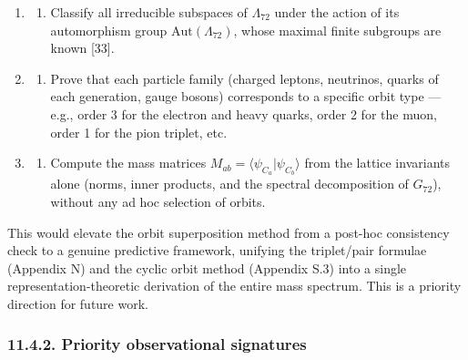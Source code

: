\documentclass[11pt]{article}
\providecommand{\tightlist}{\setlength{\itemsep}{2pt}\setlength{\parskip}{6pt}}
\providecommand{\tightlist}{%
  \setlength{\itemsep}{2pt}\setlength{\parskip}{6pt}
}
\begin{document}
\begin{enumerate}
\def\labelenumi{\arabic{enumi}.}
\item
  \begin{enumerate}
  \def\labelenumii{(\roman{enumii})}
  \tightlist
  \item
    Classify all irreducible subspaces of \(\Lambda_{72}\) under the
    action of its automorphism group \(\mathrm{Aut}(\Lambda_{72})\),
    whose maximal finite subgroups are known {[}33{]}.
  \end{enumerate}
\item
  \begin{enumerate}
  \def\labelenumii{(\roman{enumii})}
  \setcounter{enumii}{1}
  \tightlist
  \item
    Prove that each particle family (charged leptons, neutrinos, quarks
    of each generation, gauge bosons) corresponds to a specific orbit
    type --- e.g., order 3 for the electron and heavy quarks, order 2
    for the muon, order 1 for the pion triplet, etc.
  \end{enumerate}
\item
  \begin{enumerate}
  \def\labelenumii{(\roman{enumii})}
  \setcounter{enumii}{2}
  \tightlist
  \item
    Compute the mass matrices
    \(M_{ab} = \langle \psi_{C_a} | \psi_{C_b} \rangle\) from the
    lattice invariants alone (norms, inner products, and the spectral
    decomposition of \(G_{72}\)), without any ad hoc selection of
    orbits.
  \end{enumerate}
\end{enumerate}

This would elevate the orbit superposition method from a post-hoc
consistency check to a genuine predictive framework, unifying the
triplet/pair formulae (Appendix N) and the cyclic orbit method (Appendix
S.3) into a single representation-theoretic derivation of the entire
mass spectrum. This is a priority direction for future work.

\hypertarget{priority-observational-signatures}{%
\subsubsection{11.4.2. Priority observational
signatures}\label{priority-observational-signatures}}
\end{document}
